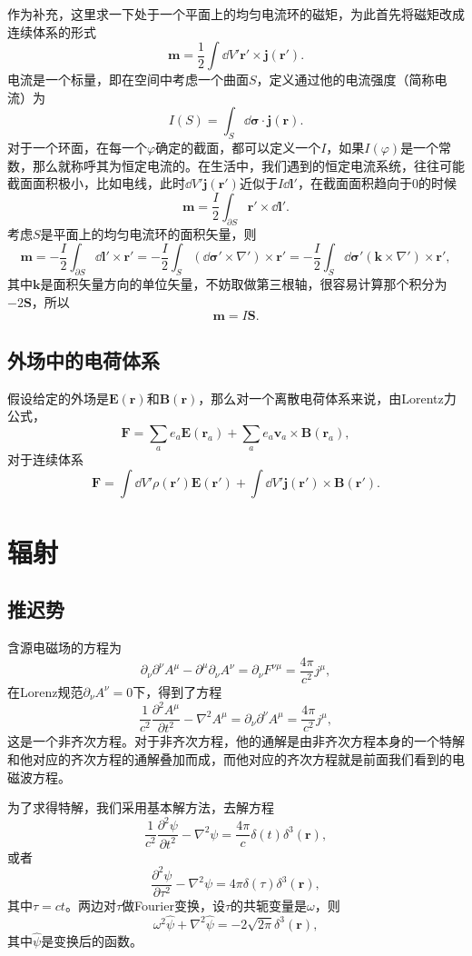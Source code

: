 \documentclass[9pt]{extbook}
\begin{document}
作为补充，这里求一下处于一个平面上的均匀电流环的磁矩，为此首先将磁矩改成连续体系的形式
\[
	\bm{m}=\frac{1}{2}\int \dd V' \bm{r}'\times \bm{j}(\bm{r}').
\]
电流是一个标量，即在空间中考虑一个曲面$S$，定义通过他的电流强度（简称电流）为
\[
	I(S)=\int_S \dd \bm{\sigma}\cdot \bm{j}(\bm{r}).
\]
对于一个环面，在每一个$\varphi$确定的截面，都可以定义一个$I$，如果$I(\varphi)$是一个常数，那么就称呼其为恒定电流的。在生活中，我们遇到的恒定电流系统，往往可能截面面积极小，比如电线，此时$\dd V'\bm{j}(\bm{r}')$近似于$I\dd \bm{l}'$，在截面面积趋向于0的时候
\[
	\bm{m}=\frac{I}{2}\int_{\partial S} \bm{r}'\times \dd \bm{l}'.
\]
考虑$S$是平面上的均匀电流环的面积矢量，则
\[
	\bm{m}=-\frac{I}{2}\int_{\partial S} \dd \bm{l}'\times \bm{r}'=-\frac{I}{2}\int_{S} (\dd \bm{\sigma}'\times \nabla')\times \bm{r}'=-\frac{I}{2}\int_{S} \dd \bm{\sigma}'(\bm{k}\times \nabla')\times \bm{r}',
\]
其中$\bm{k}$是面积矢量方向的单位矢量，不妨取做第三根轴，很容易计算那个积分为$-2\bm{S}$，所以
\[
	\bm{m}=I\bm{S}.
\]

\section{外场中的电荷体系}
假设给定的外场是$\bm{E}(\bm{r})$和$\bm{B}(\bm{r})$，那么对一个离散电荷体系来说，由Lorentz力公式，
\[
	\bm{F}=\sum_ae_a\bm{E}(\bm{r}_a)+\sum_ae_a\bm{v}_a\times \bm{B}(\bm{r}_a),
\]
对于连续体系
\[
	\bm{F}=\int \dd V'\rho(\bm{r}')\bm{E}(\bm{r}')+\int \dd V'\bm{j}(\bm{r}')\times \bm{B}(\bm{r}').
\]
\chapter{辐射}
\section{推迟势}
含源电磁场的方程为
\[
	\partial_\nu \partial^\nu A^\mu-\partial^\mu \partial_\nu A^\nu=\partial_\nu F^{\nu\mu}=\frac{4\pi}{c^2} j^\mu,
\]
在Lorenz规范$\partial_\nu A^\nu=0$下，得到了方程
\[
	\frac{1}{c^2}\frac{\partial^2 A^\mu}{\partial t^2}-\nabla^2 A^\mu=\partial_\nu \partial^\nu A^\mu=\frac{4\pi}{c^2} j^\mu,
\]
这是一个非齐次方程。对于非齐次方程，他的通解是由非齐次方程本身的一个特解和他对应的齐次方程的通解叠加而成，而他对应的齐次方程就是前面我们看到的电磁波方程。

为了求得特解，我们采用基本解方法，去解方程
\[
	\frac{1}{c^2}\frac{\partial^2 \psi}{\partial t^2}-\nabla^2 \psi=\frac{4\pi}{c} \delta(t)\delta^3(\bm{r}),
\]
或者
\[
	\frac{\partial^2 \psi}{\partial \tau^2}-\nabla^2 \psi=4\pi \delta(\tau)\delta^3(\bm{r}),
\]
其中$\tau=ct$。两边对$\tau$做Fourier变换，设$\tau$的共轭变量是$\omega$，则
\[
	\omega^2\hat{\psi}+\nabla^2 \hat{\psi}=-2\sqrt{2\pi}\delta^3(\bm{r}),
\]
其中$\hat{\psi}$是变换后的函数。
\end{document}

